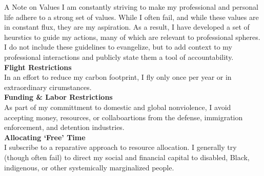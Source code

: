 \documentclass{resume} %
\begin{document}
\begin{rSection}{A Note on Values}
I am constantly striving to make my professional and personal life adhere to a strong set of values. While I often fail, and while these values are in constant flux, they are my aspiration. As a result, I have developed a set of heurstics to guide my actions, many of which are relevant to professional spheres. I do not include these guidelines to evangelize, but to add context to my professional interactions and publicly state them a tool of accountability. \\

{\bf Flight Restrictions} \\  
In an effort to reduce my carbon footprint, I fly only once per year or in extraordinary cirumstances. \\

{\bf Funding \& Labor Restrictions} \\
As part of my committment to domestic and global nonviolence, I avoid accepting money, resources, or collaboartions from the defense, immigration enforcement, and detention industries. \\

{\bf Allocating `Free' Time} \\
I subscribe to a reparative approach to resource allocation. I generally try (though often fail) to direct my social and financial capital to disabled, Black, indigenous, or other systemically marginalized people. \\

\end{rSection}





\end{document}

